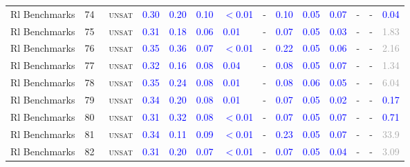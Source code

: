 \begin{center}
{\begin{longtable}{@{}llllllllllllll@{}}
Rl Benchmarks & 74 & ~\textsc{unsat} & \textcolor{blue}{0.30} & \textcolor{blue}{0.20} & \textcolor{blue}{0.10} & \textcolor{blue}{$<$0.01} & - & \textcolor{blue}{0.10} & \textcolor{blue}{0.05} & \textcolor{blue}{0.07} & - & - & \textcolor{blue}{0.04} \\
Rl Benchmarks & 75 & ~\textsc{unsat} & \textcolor{blue}{0.31} & \textcolor{blue}{0.18} & \textcolor{blue}{0.06} & \textcolor{blue}{0.01} & - & \textcolor{blue}{0.07} & \textcolor{blue}{0.05} & \textcolor{blue}{0.03} & - & - & \textcolor{darkgray}{1.83} \\
Rl Benchmarks & 76 & ~\textsc{unsat} & \textcolor{blue}{0.35} & \textcolor{blue}{0.36} & \textcolor{blue}{0.07} & \textcolor{blue}{$<$0.01} & - & \textcolor{blue}{0.22} & \textcolor{blue}{0.05} & \textcolor{blue}{0.06} & - & - & \textcolor{darkgray}{2.16} \\
Rl Benchmarks & 77 & ~\textsc{unsat} & \textcolor{blue}{0.32} & \textcolor{blue}{0.16} & \textcolor{blue}{0.08} & \textcolor{blue}{0.04} & - & \textcolor{blue}{0.08} & \textcolor{blue}{0.05} & \textcolor{blue}{0.07} & - & - & \textcolor{darkgray}{1.34} \\
Rl Benchmarks & 78 & ~\textsc{unsat} & \textcolor{blue}{0.35} & \textcolor{blue}{0.24} & \textcolor{blue}{0.08} & \textcolor{blue}{0.01} & - & \textcolor{blue}{0.08} & \textcolor{blue}{0.06} & \textcolor{blue}{0.05} & - & - & \textcolor{darkgray}{6.04} \\
Rl Benchmarks & 79 & ~\textsc{unsat} & \textcolor{blue}{0.34} & \textcolor{blue}{0.20} & \textcolor{blue}{0.08} & \textcolor{blue}{0.01} & - & \textcolor{blue}{0.07} & \textcolor{blue}{0.05} & \textcolor{blue}{0.02} & - & - & \textcolor{blue}{0.17} \\
Rl Benchmarks & 80 & ~\textsc{unsat} & \textcolor{blue}{0.31} & \textcolor{blue}{0.32} & \textcolor{blue}{0.08} & \textcolor{blue}{$<$0.01} & - & \textcolor{blue}{0.07} & \textcolor{blue}{0.05} & \textcolor{blue}{0.07} & - & - & \textcolor{blue}{0.71} \\
Rl Benchmarks & 81 & ~\textsc{unsat} & \textcolor{blue}{0.34} & \textcolor{blue}{0.11} & \textcolor{blue}{0.09} & \textcolor{blue}{$<$0.01} & - & \textcolor{blue}{0.23} & \textcolor{blue}{0.05} & \textcolor{blue}{0.07} & - & - & \textcolor{darkgray}{33.9} \\
Rl Benchmarks & 82 & ~\textsc{unsat} & \textcolor{blue}{0.31} & \textcolor{blue}{0.20} & \textcolor{blue}{0.07} & \textcolor{blue}{$<$0.01} & - & \textcolor{blue}{0.07} & \textcolor{blue}{0.05} & \textcolor{blue}{0.04} & - & - & \textcolor{darkgray}{3.09} \\

\end{longtable}}
\end{center}
